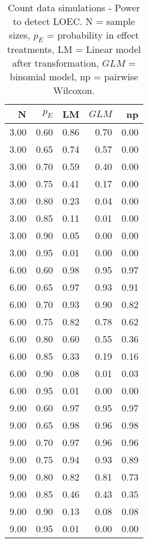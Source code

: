 \begin{table}
\centering
\caption[Count data simulations - Power to detect LOEC.]{Count data simulations - Power to detect LOEC. N = sample sizes, 
             $p_E$ = probability in effect treatments, LM = Linear model after transformation, 
             $GLM$ = binomial model, np = pairwise Wilcoxon.} 
\label{tab:pow_loec_p}
{\footnotesize
\begin{tabular}{rrrrr}
  \hline
N & $p_E$ & LM & $GLM$ & np \\ 
  \hline
3.00 & 0.60 & 0.86 & 0.70 & 0.00 \\ 
  3.00 & 0.65 & 0.74 & 0.57 & 0.00 \\ 
  3.00 & 0.70 & 0.59 & 0.40 & 0.00 \\ 
  3.00 & 0.75 & 0.41 & 0.17 & 0.00 \\ 
  3.00 & 0.80 & 0.23 & 0.04 & 0.00 \\ 
  3.00 & 0.85 & 0.11 & 0.01 & 0.00 \\ 
  3.00 & 0.90 & 0.05 & 0.00 & 0.00 \\ 
  3.00 & 0.95 & 0.01 & 0.00 & 0.00 \\ 
  6.00 & 0.60 & 0.98 & 0.95 & 0.97 \\ 
  6.00 & 0.65 & 0.97 & 0.93 & 0.91 \\ 
  6.00 & 0.70 & 0.93 & 0.90 & 0.82 \\ 
  6.00 & 0.75 & 0.82 & 0.78 & 0.62 \\ 
  6.00 & 0.80 & 0.60 & 0.55 & 0.36 \\ 
  6.00 & 0.85 & 0.33 & 0.19 & 0.16 \\ 
  6.00 & 0.90 & 0.08 & 0.01 & 0.03 \\ 
  6.00 & 0.95 & 0.01 & 0.00 & 0.00 \\ 
  9.00 & 0.60 & 0.97 & 0.95 & 0.97 \\ 
  9.00 & 0.65 & 0.98 & 0.96 & 0.98 \\ 
  9.00 & 0.70 & 0.97 & 0.96 & 0.96 \\ 
  9.00 & 0.75 & 0.94 & 0.93 & 0.89 \\ 
  9.00 & 0.80 & 0.82 & 0.81 & 0.73 \\ 
  9.00 & 0.85 & 0.46 & 0.43 & 0.35 \\ 
  9.00 & 0.90 & 0.13 & 0.08 & 0.08 \\ 
  9.00 & 0.95 & 0.01 & 0.00 & 0.00 \\ 
   \hline
\end{tabular}
}
\end{table}
